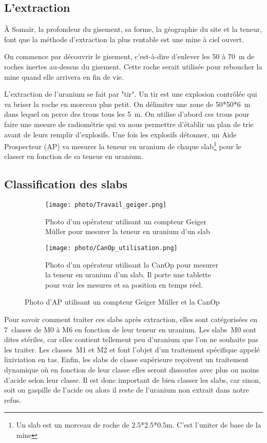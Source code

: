 \subsection{L'extraction}
\label{ssec_extraction}
À Somaïr, la profondeur du gisement, sa forme, la géographie du site et la teneur, font que la méthode d'extraction la plus rentable est une mine à ciel ouvert.

On commence par découvrir le gisement, c'est-à-dire d'enlever les 50 à 70~m de roches inertes au-dessus du gisement. Cette roche serait utilisée pour reboucher la mine quand elle arrivera en fin de vie.

L'extraction de l'uranium se fait par "tir". Un tir est une explosion contrôlée qui va briser la roche en morceau plus petit. On délimiter une zone de 50*50*6~m dans lequel on perce des trous tous les 5~m. On utilise d'abord ces trous pour faire une mesure de radiométrie qui va nous permettre d'établir un plan de trie avant de leurs remplir d'explosifs. Une fois les explosifs détonner, un Aide Prospecteur (AP) va mesurer la teneur en uranium de chaque slab\footnote{Un slab est un morceau de roche de 2.5*2.5*0.5m. C'est l'uniter de base de la mine} pour le classer en fonction de sa teneur en uranium.


\subsection{Classification des slabs}
\label{ssec_classification}
\begin{figure}

    \begin{subfigure}[t]{0.4\textwidth}
        \centering
        \texttt{[image: photo/Travail\_geiger.png]}
        \caption{Photo d'un opérateur utilisant un compteur Geiger Müller pour mesurer la teneur en uranium d'un slab}
        \label{fig_AP_geiger}
    \end{subfigure}
    \begin{subfigure}[t]{0.6\textwidth}
        \centering
        \texttt{[image: photo/CanOp\_utilisation.png]}
        \caption{Photo d'un opérateur utilisant la CanOp pour mesurer la teneur en uranium d'un slab. Il porte une tablette pour voir les mesures et sa position en temps réel.}
        \label{fig_AP_CanOp}
    \end{subfigure}
    \caption{Photo d'AP utilisant un compteur Geiger Müller et la CanOp}
\end{figure}
Pour savoir comment traiter ces slabs  après extraction, elles sont catégorisées en 7~classes de M0 à M6 en fonction de leur teneur en uranium. Les slabs~M0 sont dites stériles, car elles contient tellement peu d'uranium que l'on ne souhaite pas les traiter. Les classes~M1 et M2 et font l'objet d'un traitement spécifique appelé lixiviation en tas. Enfin, les slabs de classe supérieure reçoivent un traitement dynamique où en fonction de leur classe elles seront dissoutes avec plus ou moins d'acide selon leur classe. Il est donc important de bien classer les slabs, car sinon, soit on gaspille  de l'acide ou alors il reste de l'uranium non extrait dans notre refus.

